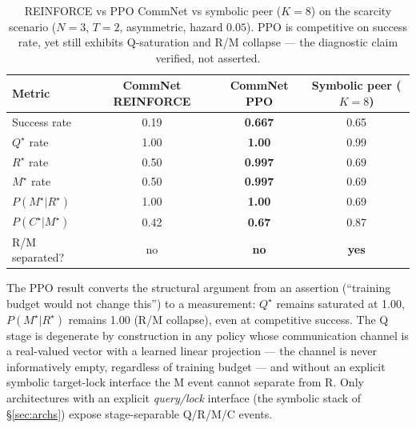 \documentclass{article}
\begin{document}
\begin{table}[h]
\centering
\small
\caption{REINFORCE vs PPO CommNet vs symbolic peer ($K{=}8$) on the scarcity scenario ($N{=}3$, $T{=}2$, asymmetric, hazard $0.05$). PPO is competitive on success rate, yet still exhibits Q-saturation and R/M collapse --- the diagnostic claim verified, not asserted.}
\label{tab:ppo-commnet}
\begin{tabular}{l c c c}
\toprule
Metric & CommNet REINFORCE & \textbf{CommNet PPO} & Symbolic peer ($K{=}8$) \\
\midrule
Success rate                  & 0.19   & \textbf{0.667} & 0.65 \\
$Q^\star$ rate                & 1.00   & \textbf{1.00}  & 0.99 \\
$R^\star$ rate                & 0.50   & \textbf{0.997} & 0.69 \\
$M^\star$ rate                & 0.50   & \textbf{0.997} & 0.69 \\
$P(M^\star|R^\star)$          & 1.00   & \textbf{1.00}  & 0.69 \\
$P(C^\star|M^\star)$          & 0.42   & \textbf{0.67}  & 0.87 \\
R/M separated?                & no     & \textbf{no}    & \textbf{yes} \\
\bottomrule
\end{tabular}
\end{table}

The PPO result converts the structural argument from an assertion (``training budget would not change this'') to a measurement: $Q^\star$ remains saturated at 1.00, $P(M^\star|R^\star)$ remains 1.00 (R/M collapse), even at competitive success. The Q stage is degenerate by construction in any policy whose communication channel is a real-valued vector with a learned linear projection --- the channel is never informatively empty, regardless of training budget --- and without an explicit symbolic target-lock interface the M event cannot separate from R. Only architectures with an explicit \emph{query/lock} interface (the symbolic stack of \S\ref{sec:archs}) expose stage-separable Q/R/M/C events.
\end{document}
